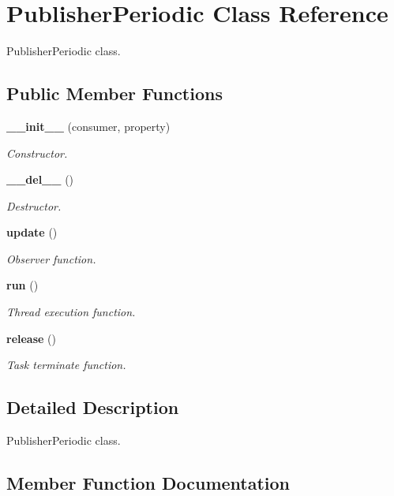\section{Publisher\-Periodic Class Reference}
\label{classPublisherPeriodic}
Publisher\-Periodic class.  


\subsection*{Public Member Functions}
\begin{CompactItemize}
\item 
{\bf \_\-\_\-init\_\-\_\-} (consumer, property)
\begin{CompactList}\small\item\em Constructor. \item\end{CompactList}\item 
{\bf \_\-\_\-del\_\-\_\-} ()
\begin{CompactList}\small\item\em Destructor. \item\end{CompactList}\item 
{\bf update} ()
\begin{CompactList}\small\item\em Observer function. \item\end{CompactList}\item 
{\bf run} ()
\begin{CompactList}\small\item\em Thread execution function. \item\end{CompactList}\item 
{\bf release} ()
\begin{CompactList}\small\item\em Task terminate function. \item\end{CompactList}\end{CompactItemize}


\subsection{Detailed Description}
Publisher\-Periodic class. 



\subsection{Member Function Documentation}
